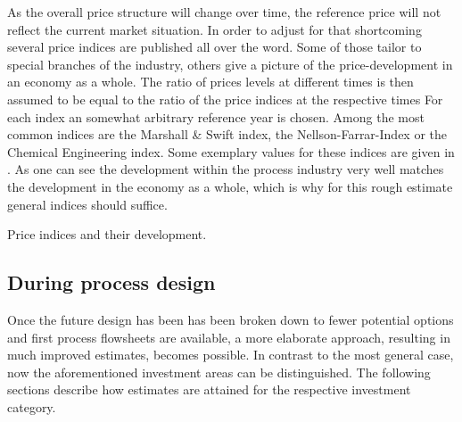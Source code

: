         As the overall price structure will change over time, the reference price will not reflect the current
        market situation. In order to adjust for that shortcoming several price indices are published
        all over the word. Some of those tailor to special branches of the industry, others give a picture
        of the price-development in an economy as a whole. The ratio of prices levels at different times
        is then assumed to be equal to the ratio of the price indices at the respective times
        For each index an somewhat arbitrary reference year is chosen. Among the most common indices are the
        Marshall \& Swift index, the Nellson-Farrar-Index or the Chemical Engineering index. Some exemplary
        values for these indices are given in . As one can see the development within the
        process industry very well matches the development in the economy as a whole, which is why for this rough
        estimate general indices should suffice.

        \begin{table}
        	\center
        	
        	\caption{Price indices and their development.\cite{Coulson.1999}}
        	\label{tab:PriceIndices}
        \end{table}

    \subsection{During process design}
        Once the future design has been has been broken down to fewer potential options and first process
        flowsheets are available, a more elaborate approach, resulting in much improved estimates, becomes possible.
        In contrast to the most general case, now the aforementioned investment areas can be distinguished.
        The following sections describe how estimates are attained for the respective investment category.

